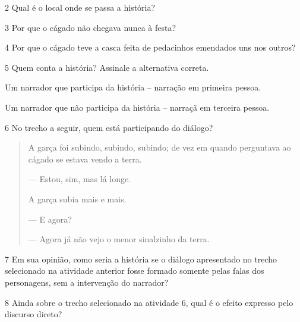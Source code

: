 
\num{2} Qual é o local onde se passa a história?


\num{3} Por que o cágado não chegava nunca à festa?


\num{4} Por que o cágado teve a casca feita de pedacinhos emendados uns nos
outros?


\num{5} Quem conta a história? Assinale a alternativa correta.

\begin{boxlist}
 Um narrador que participa da história -- narração em primeira pessoa.

 Um narrador que não participa da história -- narraçã em terceira pessoa.
\end{boxlist}

\num{6} No trecho a seguir, quem está participando do diálogo?

\begin{quote}
A garça foi subindo, subindo, subindo; de vez em quando perguntava ao
cágado se estava vendo a terra.

--- Estou, sim, mas lá longe.

A garça subia mais e mais.

--- E agora?

--- Agora já não vejo o menor sinalzinho da terra.
\end{quote}


\num{7} Em sua opinião, como seria a história se o diálogo apresentado no trecho selecionado na atividade anterior fosse formado
somente pelas falas dos personagens, sem a intervenção do narrador?




\num{8} Ainda sobre o trecho selecionado na atividade 6, qual é o efeito expresso pelo discurso direto?


